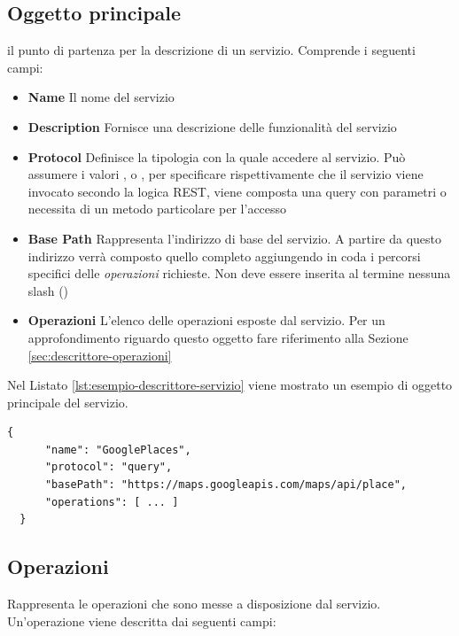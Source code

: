 \subsection{Oggetto principale\label{sec:oggetto-principale-servizi}}

\upe il punto di partenza per la descrizione di un servizio. Comprende i seguenti campi:

\begin{itemize}
	\item \textbf{Name} Il nome del servizio
	\item \textbf{Description} Fornisce una descrizione delle funzionalità del servizio
	\item \textbf{Protocol} Definisce la tipologia con la quale accedere al servizio. Può assumere i valori ,  o , per specificare rispettivamente che il servizio viene invocato secondo la logica REST, viene composta una query con parametri o necessita di un metodo particolare per l'accesso
	\item \textbf{Base Path} Rappresenta l'indirizzo di base del servizio. A partire da questo indirizzo verrà composto quello completo aggiungendo in coda i percorsi specifici delle \emph{operazioni} richieste. Non deve essere inserita al termine nessuna slash (\virgolette{/})
	\item \textbf{Operazioni} L'elenco delle operazioni esposte dal servizio. Per un approfondimento riguardo questo oggetto fare riferimento alla Sezione \ref{sec:descrittore-operazioni}
\end{itemize}

Nel Listato \ref{lst:esempio-descrittore-servizio} viene mostrato un esempio di oggetto principale del servizio.

\begin{lstlisting}[style=blocco-esempi,
								caption=Esempio di servizio,
								label=lst:esempio-descrittore-servizio]
  {
	  "name": "GooglePlaces",
	  "protocol": "query",
	  "basePath": "https://maps.googleapis.com/maps/api/place",
	  "operations": [ ... ]
  }
\end{lstlisting}

\subsection{Operazioni\label{sec:descrittore-operazioni}}

Rappresenta le operazioni che sono messe a disposizione dal servizio. Un'operazione viene descritta dai seguenti campi:


